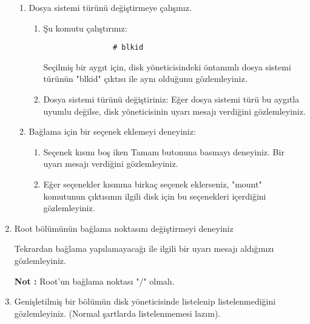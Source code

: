 \documentclass[a4paper,10pt]{article}
\begin{document}
\begin{enumerate}
\begin{enumerate}
    \item Dosya sistemi türünü değiştirmeye çalışınız.
        \begin{enumerate}
            \item Şu komutu çalıştırınız:
            \begin{verbatim}
                # blkid
            \end{verbatim}
                  Seçilmiş bir aygıt için, disk yöneticisindeki öntanımlı dosya sistemi türünün "blkid" çıktısı ile aynı olduğunu gözlemleyiniz.
            \item Dosya sistemi türünü değiştiriniz:
                  Eğer dosya sistemi türü bu aygıtla uyumlu değilse, disk yöneticisinin uyarı mesajı verdiğini gözlemleyiniz.
        \end{enumerate}

    \item Bağlama için bir seçenek eklemeyi deneyiniz:
        \begin{enumerate}
          \item Seçenek kısmı boş iken Tamam butonuna basmayı deneyiniz.
                Bir uyarı mesajı verdiğini gözlemleyiniz.
          \item Eğer seçenekler kısmına birkaç seçenek eklerseniz,
                "mount" komutunun çıktısının ilgili disk için bu seçenekleri içerdiğini gözlemleyiniz.
        \end{enumerate}
    \end{enumerate}

\item Root bölümünün bağlama noktasını değiştirmeyi deneyiniz

      Tekrardan bağlama yapılamayacağı ile ilgili bir uyarı mesajı aldığınızı gözlemleyiniz.

        \textbf{Not :} Root'un bağlama noktası "/" olmalı.

\item Genişletilmiş bir bölümün disk yöneticisinde listelenip listelenmediğini gözlemleyiniz. (Normal şartlarda listelenmemesi lazım).

\end{enumerate}
\end{document}
